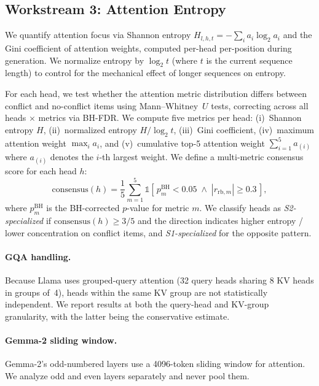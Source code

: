 \subsection{Workstream 3: Attention Entropy}
\label{sec:attention}

We quantify attention focus via Shannon entropy
$H_{l,h,t} = -\sum_i a_i \log_2 a_i$ and the Gini coefficient of attention
weights, computed per-head per-position during generation.  We normalize
entropy by $\log_2 t$ (where $t$ is the current sequence length) to control
for the mechanical effect of longer sequences on entropy.

For each head, we test whether the attention metric distribution differs
between conflict and no-conflict items using Mann--Whitney~$U$ tests,
correcting across all heads $\times$ metrics via BH-FDR.  We compute five
metrics per head: (i)~Shannon entropy $H$, (ii)~normalized entropy
$H / \log_2 t$, (iii)~Gini coefficient, (iv)~maximum attention weight
$\max_i a_i$, and (v)~cumulative top-5 attention weight
$\sum_{i=1}^{5} a_{(i)}$ where $a_{(i)}$ denotes the $i$-th largest
weight.  We define a multi-metric consensus score for each head $h$:
\begin{equation}
  \text{consensus}(h) = \frac{1}{5}\sum_{m=1}^{5}
    \mathbb{1}\!\left[\,p_m^{\text{BH}} < 0.05 \;\wedge\;
    |r_{\text{rb},m}| \geq 0.3\,\right],
  \label{eq:consensus}
\end{equation}
where $p_m^{\text{BH}}$ is the BH-corrected $p$-value for metric $m$.
We classify heads as \emph{S2-specialized} if $\text{consensus}(h) \geq
3/5$ and the direction indicates higher entropy / lower concentration on
conflict items, and \emph{S1-specialized} for the opposite pattern.

\paragraph{GQA handling.}  Because Llama uses grouped-query attention (32
query heads sharing 8 KV heads in groups of~4), heads within the same KV
group are not statistically independent.  We report results at both the
query-head and KV-group granularity, with the latter being the conservative
estimate.

\paragraph{Gemma-2 sliding window.}  Gemma-2's odd-numbered layers use a
4096-token sliding window for attention.  We analyze odd and even layers
separately and never pool them.

